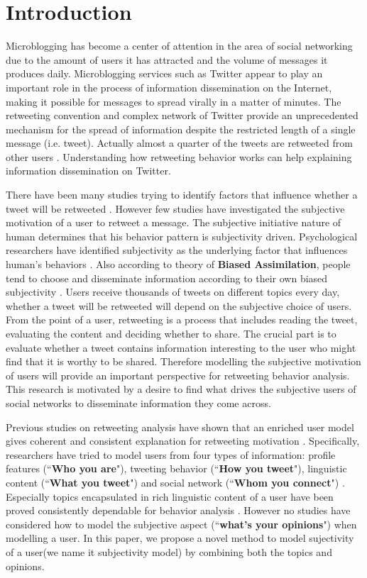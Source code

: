 \documentclass[letterpaper]{article}
\begin{document}
\section{Introduction}
\label{introduction}
\noindent Microblogging has become a center of attention in the area of social networking due to the amount of users it has attracted and the volume of messages it produces daily. 
Microblogging services such as Twitter appear to play an important role in the process of information dissemination on the Internet, making it possible for messages to spread virally in a matter of minutes. 
The retweeting convention and complex network of Twitter provide an unprecedented mechanism for the spread of information despite the restricted length of a single message (i.e. tweet). 
Actually almost a quarter of the tweets are retweeted from other users \cite{yang2010understanding}. 
Understanding how retweeting behavior works can help explaining information dissemination on Twitter. 

There have been many studies trying to identify factors that influence whether a tweet will be retweeted \cite{boyd2010tweet,kwak2010twitter}. However few studies have investigated the subjective motivation of a user to retweet a message. 
The subjective initiative nature of human determines that his behavior pattern is subjectivity driven. Psychological researchers have identified subjectivity as the underlying factor that influences human's behaviors \cite{moore2008awareness}. 
Also according to theory of \textbf{Biased Assimilation}, people tend to choose and disseminate information according to their own biased subjectivity \cite{Hyman2000}. 
Users receive thousands of tweets on different topics every day, whether a tweet will be retweeted will depend on the subjective choice of users. 
From the point of a user, retweeting is a process that includes reading the tweet, evaluating the content and deciding whether to share. The crucial part is to evaluate whether a tweet contains information interesting to the user who might find that it is worthy to be shared.  
Therefore modelling the subjective motivation of users will provide an important perspective for retweeting behavior analysis. 
This research is motivated by a desire to find what drives the subjective users of social networks to disseminate information they come across. 

Previous studies on retweeting analysis have shown that an enriched user model gives coherent and consistent explanation for retweeting motivation \cite{macskassy2011people,feng2013retweet}. 
Specifically, researchers have tried to model users from four types of information:
profile features (``\textbf{Who you are}"), tweeting behavior (``\textbf{How you tweet}"), linguistic content (``\textbf{What you tweet}") and social network (``\textbf{Whom you connect}") \cite{pennacchiotti2011machine}. 
Especially topics encapsulated in rich linguistic content of a user have been proved consistently dependable for behavior analysis \cite{petrovic2011rt}. However no studies have considered how to model the subjective aspect (``\textbf{what's your opinions}") when modelling a user.  In this paper, we propose a novel method to model sujectivity of a user(we name it subjectivity model) by combining both the topics and opinions.
\end{document}
